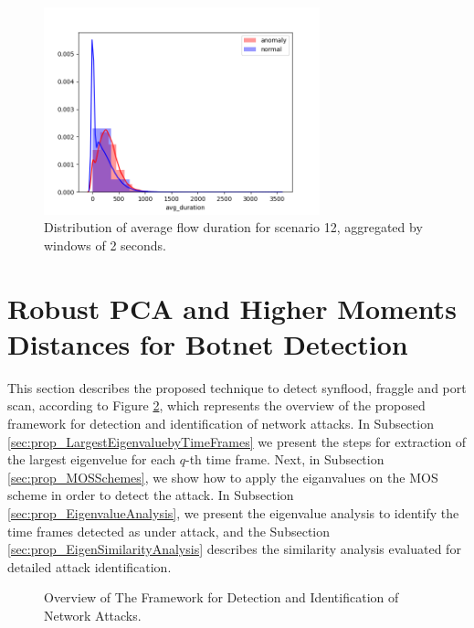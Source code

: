 \documentclass[review]{elsarticle}
\begin{document}
\begin{figure}[h!]
     \centering
     \includegraphics[width=8cm]{figures/agg_distplot_2s_12_avg_duration.png}
     \caption{Distribution of average flow duration for scenario 12, aggregated by windows of 2 seconds.}
     \label{fig:fig08}
\end{figure}


\section{Robust PCA and Higher Moments Distances for Botnet Detection}
\label{sec:m_rpca}

This section describes the proposed technique to detect synflood, fraggle and port scan, according to Figure \ref{fig:fig80}, which represents the overview of the proposed framework for detection and identification of network attacks. In Subsection \ref{sec:prop_LargestEigenvaluebyTimeFrames} we present the steps for extraction of the largest eigenvelue for each $q$-th time frame. Next, in Subsection \ref{sec:prop_MOSSchemes}, we show how to apply the eiganvalues on the MOS scheme in order to detect the attack. In Subsection \ref{sec:prop_EigenvalueAnalysis}, we present the eigenvalue analysis to identify the time frames detected as under attack, and the Subsection \ref{sec:prop_EigenSimilarityAnalysis} describes the similarity analysis evaluated for detailed attack identification.

\begin{figure}[h!]
	\centering
     \caption{Overview of The Framework for Detection and Identification of Network Attacks.}
     \label{fig:fig80}
\end{figure}
\end{document}
